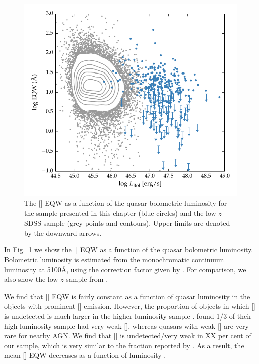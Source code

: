 \begin{figure}
    \includegraphics[width=\columnwidth]{figures/chapter04/eqw_lum.pdf} 
    \caption[{The [] EQW as a function of the quasar bolometric luminosity for the sample presented in this chapter (blue circles) and the low-$z$ SDSS sample (grey points and contours).}]{The [] EQW as a function of the quasar bolometric luminosity for the sample presented in this chapter (blue circles) and the low-$z$ SDSS sample (grey points and contours). Upper limits are denoted by the downward arrows. }     
    \label{fig:eqw_lum}
\end{figure}

In Fig.~\ref{fig:eqw_lum} we show the [] EQW as a function of the quasar bolometric luminosity. 
Bolometric luminosity is estimated from the monochromatic continuum luminosity at 5100\AA, using the correction factor given by \citet{richards06}. 
For comparison, we also show the low-$z$ sample from \citet{shen11}.  

We find that [] EQW is fairly constant as a function of quasar luminosity in the objects with prominent [] emission. 
However, the proportion of objects in which [] is undetected is much larger in the higher luminosity sample \citep[e.g.][]{netzer04}. 
\citet{netzer04} found 1/3 of their high luminosity sample had very weak [], whereas quasars with weak [] are very rare for nearby AGN. 
We find that [] is undetected/very weak in XX per cent of our sample, which is very similar to the fraction reported by \citet{netzer04}.  
As a result, the mean [] EQW decreases as a function of luminosity \citep[e.g.][]{brotherton96,netzer04,sulentic04,baskin05b}. 

